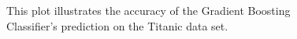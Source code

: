 \begin{figure}[H]
    \captionsetup{format=plain}
    \caption{This plot illustrates the accuracy of the Gradient Boosting Classifier's prediction on
             the Titanic data set.}
    \label{fig:confusion_matrix_gradient_boosting}
\end{figure}

